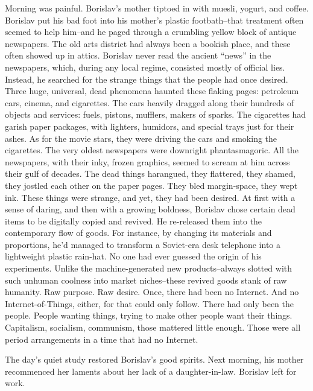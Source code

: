 \documentclass[20 pt,twoside,extrafontsizes,final]{memoir}
\begin{document}
Morning was painful. Borislav's mother tiptoed in with muesli, yogurt, and coffee. Borislav put his bad foot into his mother's plastic footbath--that treatment often seemed to help him--and he paged through a crumbling yellow block of antique newspapers. The old arts district had always been a bookish place, and these often showed up in attics. Borislav never read the ancient ``news'' in the newspapers, which, during any local regime, consisted mostly of official lies. Instead, he searched for the strange things that the people had once desired. Three huge, universal, dead phenomena haunted these flaking pages: petroleum cars, cinema, and cigarettes. The cars heavily dragged along their hundreds of objects and services: fuels, pistons, mufflers, makers of sparks. The cigarettes had garish paper packages, with lighters, humidors, and special trays just for their ashes. As for the movie stars, they were driving the cars and smoking the cigarettes.
The very oldest newspapers were downright phantasmagoric. All the newspapers, with their inky, frozen graphics, seemed to scream at him across their gulf of decades. The dead things harangued, they flattered, they shamed, they jostled each other on the paper pages. They bled margin-space, they wept ink. These things were strange, and yet, they had been desired. At first with a sense of daring, and then with a growing boldness, Borislav chose certain dead items to be digitally copied and revived. He re-released them into the contemporary flow of goods. For instance, by changing its materials and proportions, he'd managed to transform a Soviet-era desk telephone into a lightweight plastic rain-hat. No one had ever guessed the origin of his experiments. Unlike the machine-generated new products--always slotted with such unhuman coolness into market niches--these revived goods stank of raw humanity. Raw purpose.
Raw desire. Once, there had been no Internet. And no Internet-of-Things, either, for that could only follow. There had only been the people. People wanting things, trying to make other people want their things. Capitalism, socialism, communism, those mattered little enough. Those were all period arrangements in a time that had no Internet.

The day's quiet study restored Borislav's good spirits. Next morning, his mother recommenced her laments about her lack of a daughter-in-law. Borislav left for work.
\end{document}

